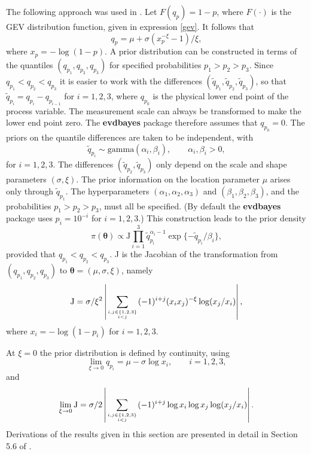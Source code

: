 \documentclass[11pt,a4paper]{article}
\newcommand{\bs}{\boldsymbol}
\newcommand{\sfrac}[2]{\genfrac{}{}{0pt}{}{#1}{#2}}
\begin{document}
The following approach was used in \citet{coletawn96}.  Let $F(q_p) =
1-p$, where $F(\cdot)$ is the GEV distribution function, given in
expression \eqref{gev}. It follows that
\begin{equation*}
q_p = \mu + \sigma(x_p^{-\xi} - 1)/\xi,
\end{equation*}
where $x_p=-\log(1-p)$.  A prior distribution can be constructed in
terms of the quantiles $(q_{p_1},q_{p_2},q_{p_3})$ for specified
probabilities $p_1 > p_2 > p_3$.  Since $q_{p_1} < q_{p_2} < q_{p_3}$
it is easier to work with the differences
$(\tilde{q}_{p_1},\tilde{q}_{p_2},\tilde{q}_{p_3})$, so that
$\tilde{q}_{p_i} = q_{p_i} - q_{p_{i-1}}$ for $i=1,2,3$, where
$q_{p_0}$ is the physical lower end point of the process variable.
The measurement scale can always be transformed to make the lower end
point zero.  The \textbf{evdbayes} package therefore assumes that
$q_{p_0} = 0$.  The priors on the quantile differences are taken to be
independent, with
\begin{equation*}
\tilde{q}_{p_i} \sim \text{gamma}(\alpha_i,\beta_i), \qquad \alpha_i,\beta_i > 0,
\end{equation*}
for $i=1,2,3$.  The differences $(\tilde{q}_{p_2},\tilde{q}_{p_3})$
only depend on the scale and shape parameters $(\sigma,\xi)$.  The
prior information on the location parameter $\mu$ arises only through
$\tilde{q}_{p_1}$.  The hyperparameters $(\alpha_1,\alpha_2,\alpha_3)$
and $(\beta_1,\beta_2,\beta_3)$, and the probabilities $p_1 > p_2 >
p_3$, must all be specified.  (By default the \textbf{evdbayes}
package uses $p_i=10^{-i}$ for $i=1,2,3$.)  This construction leads to
the prior density
\begin{equation}
  \pi(\bs{\theta}) \propto \text{J}
  \prod_{i=1}^{3} \tilde{q}_{p_i}^{\alpha_i-1}
  \exp\{-\tilde{q}_{p_i}/\beta_i\}, 
\label{priorgamma}
\end{equation}
provided that $q_{p_1} < q_{p_2} < q_{p_3}$. J is the Jacobian of the
transformation from $(q_{p_1},q_{p_2},q_{p_3})$ to
$\bs{\theta}=(\mu,\sigma,\xi)$, namely
\begin{equation*}
  \text{J} = \sigma/\xi^2 \left| \sum_{\sfrac{i,j \in \{1,2,3\}}{i <
        j}} (-1)^{i+j} (x_ix_j)^{-\xi} \log (x_j / x_i) \right|, 
\end{equation*}
where $x_i = -\log(1 - p_i)$ for $i=1,2,3$.

At $\xi=0$ the prior distribution is defined by continuity, using
\begin{equation*}
  \lim_{\xi\rightarrow0}q_{p_i} = \mu-\sigma \log x_i, \qquad i=1,2,3,
\end{equation*}
and
\begin{equation*}
  \lim_{\xi\rightarrow0}\text{J} = \sigma/2 \left| \sum_{\sfrac{i,j
        \in \{1,2,3\}}{i < j}} (-1)^{i+j} \log x_i \log x_j \log (x_j
    / x_i) \right|. 
\end{equation*}
Derivations of the results given in this section are presented in
detail in Section 5.6 of \citet{step:phd}.
\end{document}
